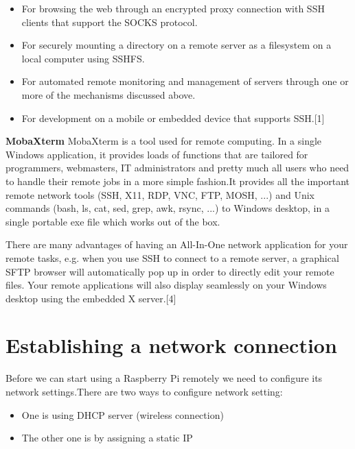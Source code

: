 \documentclass[11pt,a4paper]{report}
\begin{document}
\begin{flushleft}
\begin{itemize}
		\item For browsing the web through an encrypted proxy connection with SSH clients that support the SOCKS protocol.
		\item For securely mounting a directory on a remote server as a filesystem on a local computer using SSHFS.
		\item For automated remote monitoring and management of servers through one or more of the mechanisms discussed above.
		\item For development on a mobile or embedded device that supports SSH.[1]
	\end{itemize}
	
	\flushleft
	\textbf{MobaXterm}
	\vspace{0.4cm}
	\newline MobaXterm is a tool used for remote computing. In a single Windows application, it provides loads of functions that are tailored for programmers, webmasters, IT administrators and pretty much all users who need to handle their remote jobs in a more simple fashion.It provides all the important remote network tools (SSH, X11, RDP, VNC, FTP, MOSH, ...) and Unix commands (bash, ls, cat, sed, grep, awk, rsync, ...) to Windows desktop, in a single portable exe file which works out of the box. \newline
	
	There are many advantages of having an All-In-One network application for your remote tasks, e.g. when you use SSH to connect to a remote server, a graphical SFTP browser will automatically pop up in order to directly edit your remote files. Your remote applications will also display seamlessly on your Windows desktop using the embedded X server.[4]
		
	\newpage
	
	
	\section{Establishing a network connection}
	Before we can start using a Raspberry Pi remotely we need to configure its network settings.There are two ways to configure network setting:
	\begin{itemize}
		\item One is using DHCP server (wireless connection)
		\item The other one is by assigning a static IP
	\end{itemize}

\end{flushleft}
\end{document}
